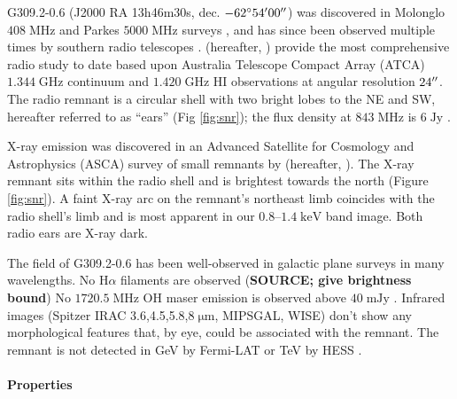 \documentclass[preprint2,tighten,trackchanges]{aastex6}
\newcommand*{\mt}{\mathrm}
\newcommand*{\unit}[1]{\;\mt{#1}}  %
\begin{document}
G309.2-0.6 (J2000 RA 13h46m30s, dec. $-62\mbox{$^\circ$} 54\mbox{$^\prime$} 00\mbox{$^{\prime\prime}$}$) was
discovered in Molonglo $408 \unit{MHz}$ and Parkes $5000 \unit{MHz}$ surveys
\citep{day1969, clark1973, green1974, clark1975}, and has since been observed multiple
times by southern radio telescopes \citep{caswell1981, kesteven1987,
whiteoak1996, gaensler1998}.
\citet{gaensler1998} (hereafter, ) provide the most
comprehensive radio study to date based upon Australia Telescope Compact Array
(ATCA) $1.344 \unit{GHz}$ continuum and $1.420 \unit{GHz}$ HI observations at
angular resolution $24\mbox{$^{\prime\prime}$}$.
The radio remnant is a circular shell with two bright lobes to the NE and SW,
hereafter referred to as ``ears'' (Fig \ref{fig:snr});
the flux density at $843 \unit{MHz}$ is $6 \unit{Jy}$ \citep{whiteoak1996}.

X-ray emission was discovered in an Advanced Satellite for Cosmology and
Astrophysics (ASCA) survey of small remnants by \citet{rakowski2001}
(hereafter, ).
The X-ray remnant sits within the radio shell and is brightest towards the
north (Figure \ref{fig:snr}).
A faint X-ray arc on the remnant's northeast limb coincides with the radio
shell's limb and is most apparent in our $0.8$--$1.4 \unit{keV}$ band image.
Both radio ears are X-ray dark.

The field of G309.2-0.6 has been well-observed in galactic plane surveys in
many wavelengths.
No H$\alpha$ filaments are observed (\textbf{SOURCE; give brightness bound}) %
No $1720.5 \unit{MHz}$ OH maser emission is observed above $40 \unit{mJy}$
\citep{green1997}.
Infrared images (Spitzer IRAC 3.6,4.5,5.8,$8 \unit{{\mu}m}$, MIPSGAL, WISE)
don't show any morphological features that, by eye, could be associated with
the remnant.
The remnant is not detected in GeV by Fermi-LAT \citep{acero2016} or TeV by
HESS \citep{bochow2011}.

\paragraph{Properties}
\end{document}
